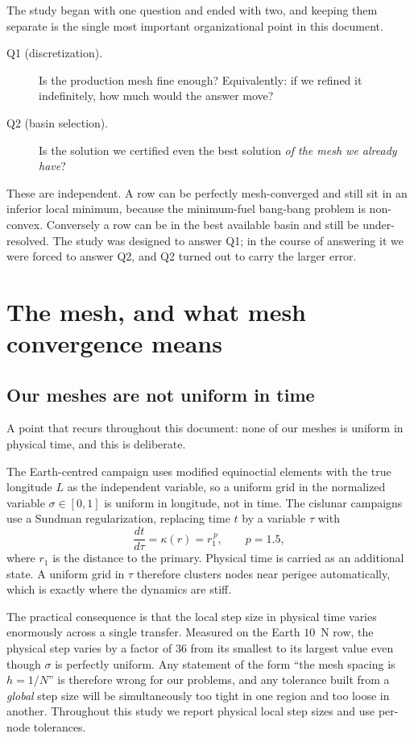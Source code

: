 \documentclass[11pt]{article}
\begin{document}
The study began with one question and ended with two, and keeping them separate
is the single most important organizational point in this document.

\begin{description}
  \item[Q1 (discretization).] Is the production mesh fine enough? Equivalently:
  if we refined it indefinitely, how much would the answer move?
  \item[Q2 (basin selection).] Is the solution we certified even the best
  solution \emph{of the mesh we already have}?
\end{description}

These are independent. A row can be perfectly mesh-converged and still sit in
an inferior local minimum, because the minimum-fuel bang-bang problem is
non-convex. Conversely a row can be in the best available basin and still be
under-resolved. The study was designed to answer Q1; in the course of answering
it we were forced to answer Q2, and Q2 turned out to carry the larger error.

\section{The mesh, and what mesh convergence means}
\label{sec:mesh}

\subsection{Our meshes are not uniform in time}

A point that recurs throughout this document: none of our meshes is uniform in
physical time, and this is deliberate.

The Earth-centred campaign uses modified equinoctial elements with the true
longitude $L$ as the independent variable, so a uniform grid in the normalized
variable $\sigma \in [0,1]$ is uniform in longitude, not in time. The
cislunar campaigns use a Sundman regularization, replacing time $t$ by a
variable $\tau$ with
\begin{equation}
  \frac{dt}{d\tau} = \kappa(r) = r_1^{\,p}, \qquad p = 1.5,
  \label{eq:sundman}
\end{equation}
where $r_1$ is the distance to the primary. Physical time is carried as an
additional state. A uniform grid in $\tau$ therefore clusters nodes near
perigee automatically, which is exactly where the dynamics are stiff.

The practical consequence is that the local step size in physical time varies
enormously across a single transfer. Measured on the Earth $10$~N row, the
physical step varies by a factor of $36$ from its smallest to its largest value
even though $\sigma$ is perfectly uniform. Any statement of the form ``the mesh
spacing is $h = 1/N$'' is therefore wrong for our problems, and any tolerance
built from a \emph{global} step size will be simultaneously too tight in one
region and too loose in another. Throughout this study we report physical local
step sizes and use per-node tolerances.
\end{document}
